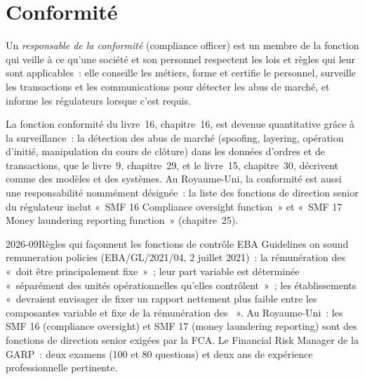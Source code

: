 \section{Conformité}

\begin{definition}\label{def:in:risk-operations-product-control-and-compliance:compliance}
Un \emph{responsable de la conformité} (compliance officer) est un membre de la fonction qui veille à ce qu'une société et son personnel
respectent les lois et règles qui leur sont applicables~: elle conseille les métiers, forme et certifie le personnel, surveille les transactions et les
communications pour détecter les abus de marché, et informe les régulateurs lorsque c'est requis.
\end{definition}

La fonction conformité du livre~16, chapitre~16, est devenue quantitative grâce à la surveillance~: la détection des abus de
marché (spoofing, layering, opération d'initié, manipulation du cours de clôture) dans les données d'ordres et de transactions, que le livre~9, chapitre~29, et
le livre~15, chapitre~30, décrivent comme des modèles et des systèmes. Au Royaume-Uni, la conformité est aussi une responsabilité nommément désignée~: la
liste des fonctions de direction senior du régulateur inclut «~SMF 16 Compliance oversight function~» et «~SMF 17 Money
laundering reporting function~» (chapitre~25).

\begin{dated}{2026-09}{Règles qui façonnent les fonctions de contrôle}\label{dat:in:risk-operations-product-control-and-compliance:rules}
EBA Guidelines on sound remuneration policies (EBA/GL/2021/04, 2 juillet 2021)~: la rémunération des  «~doit être
principalement fixe~»~; leur part variable est déterminée «~séparément des unités opérationnelles qu'elles contrôlent~»~; les établissements
«~devraient envisager de fixer un rapport nettement plus faible entre les composantes variable et fixe de la rémunération des
~». Au Royaume-Uni~: les SMF 16 (compliance oversight) et SMF 17 (money laundering reporting) sont
des fonctions de direction senior exigées par la FCA. Le Financial Risk Manager de la GARP~: deux examens (100 et 80 questions) et deux ans de
expérience professionnelle pertinente.
\end{dated}

